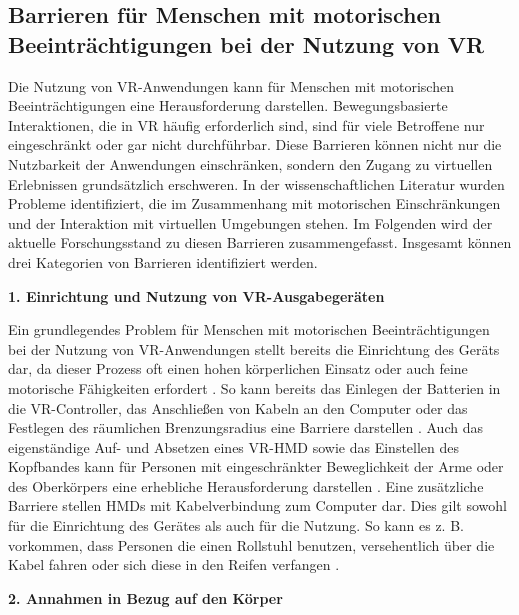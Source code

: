 \subsection{Barrieren für Menschen mit motorischen Beeinträchtigungen bei der Nutzung von VR}

Die Nutzung von VR-Anwendungen kann für Menschen mit motorischen Beeinträchtigungen eine Herausforderung darstellen. Bewegungsbasierte Interaktionen, die in VR häufig erforderlich sind, sind für viele Betroffene nur eingeschränkt oder gar nicht durchführbar. Diese Barrieren können nicht nur die Nutzbarkeit der Anwendungen einschränken, sondern den Zugang zu virtuellen Erlebnissen grundsätzlich erschweren. In der wissenschaftlichen Literatur wurden Probleme identifiziert, die im Zusammenhang mit motorischen Einschränkungen und der Interaktion mit virtuellen Umgebungen stehen. Im Folgenden wird der aktuelle Forschungsstand zu diesen Barrieren zusammengefasst. Insgesamt können drei Kategorien von Barrieren identifiziert werden.

{\normalfont \bfseries 1. Einrichtung und Nutzung von VR-Ausgabegeräten}  

Ein grundlegendes Problem für Menschen mit motorischen Beeinträchtigungen bei der Nutzung von VR-Anwendungen stellt bereits die Einrichtung des Geräts dar, da dieser Prozess oft einen hohen körperlichen Einsatz oder auch feine motorische Fähigkeiten erfordert \citep{gerling_critical_2021}. So kann bereits das Einlegen der Batterien in die VR-Controller, das Anschließen von Kabeln an den Computer oder das Festlegen des räumlichen Brenzungsradius eine Barriere darstellen \citep{10.1145/3373625.3416998}. Auch das eigenständige Auf- und Absetzen eines VR-HMD sowie das Einstellen des Kopfbandes kann für Personen mit eingeschränkter Beweglichkeit der Arme oder des Oberkörpers eine erhebliche Herausforderung darstellen \citep{10.1145/3373625.3416998}. Eine zusätzliche Barriere stellen HMDs mit Kabelverbindung zum Computer dar. Dies gilt sowohl für die Einrichtung des Gerätes als auch für die Nutzung. So kann es z. B.  vorkommen, dass Personen die einen Rollstuhl benutzen, versehentlich über die Kabel fahren oder sich diese in den Reifen verfangen \citep{10.1145/3373625.3416998, wong_survey_2017}. 

{\normalfont \bfseries 2. Annahmen in Bezug auf den Körper} 
 
